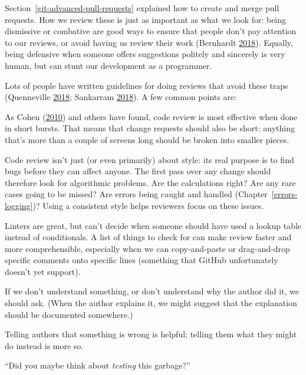 \documentclass[
]{krantz}
\providecommand{\tightlist}{%
  \setlength{\itemsep}{0pt}\setlength{\parskip}{0pt}}
\begin{document}
Section~\ref{git-advanced-pull-requests} explained how to create and merge pull requests.
How we review these is just as important as what we look for:
being dismissive or combative are good ways to ensure that people don't pay attention to our reviews,
or avoid having us review their work (Bernhardt \protect\hyperlink{ref-Bern2018}{2018}).
Equally,
being defensive when someone offers suggestions politely and sincerely is very human,
but can stunt our development as a programmer.

Lots of people have written guidelines for doing reviews that avoid these traps (Quenneville \protect\hyperlink{ref-Quen2018}{2018}; Sankarram \protect\hyperlink{ref-Sank2018}{2018}).
A few common points are:

\begin{description}
\tightlist
\item[Work in small increments.]
As Cohen (\protect\hyperlink{ref-Cohe2010}{2010}) and others have found,
code review is most effective when done in short bursts.
That means that change requests should also be short:
anything that's more than a couple of screens long
should be broken into smaller pieces.
\item[Look for algorithmic problems first.]
Code review isn't just (or even primarily) about style:
its real purpose is to find bugs before they can affect anyone.
The first pass over any change should therefore look for algorithmic problems.
Are the calculations right?
Are any rare cases going to be missed?
Are errors being caught and handled (Chapter~\ref{errors-logging})?
Using a consistent style helps reviewers focus on these issues.
\item[Use a checklist.]
Linters are great,
but can't decide when someone should have used a lookup table instead of conditionals.
A list of things to check for can make review faster and more comprehensible,
especially when we can copy-and-paste or drag-and-drop specific comments
onto specific lines
(something that GitHub unfortunately doesn't yet support).
\item[Ask for clarification.]
If we don't understand something,
or don't understand why the author did it,
we should ask.
(When the author explains it,
we might suggest that the explanation should be documented somewhere.)
\item[Offer alternatives.]
Telling authors that something is wrong is helpful;
telling them what they might do instead is more so.
\item[Don't be sarcastic or disparaging.]
``Did you maybe think about \emph{testing} this garbage?''

\end{description}
\end{document}
